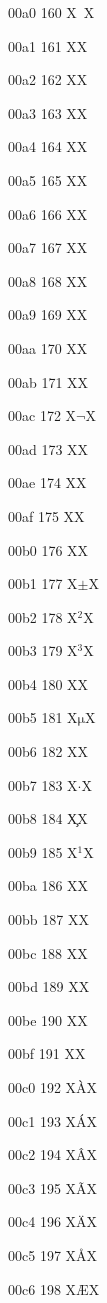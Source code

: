 \documentclass[11pt]{article}
\begin{document}
00a0 160 X{~}X

00a1 161 X{\textexclamdown}X

00a2 162 X{\textcent}X

00a3 163 X{\textsterling}X

00a4 164 X{\textcurrency}X

00a5 165 X{\textyen}X

00a6 166 X{\textbrokenbar}X

00a7 167 X{\textsection}X

00a8 168 X{\textasciidieresis}X

00a9 169 X{\textcopyright}X

00aa 170 X{\textordfeminine}X

00ab 171 X{\guillemotleft}X

00ac 172 X{\ensuremath{\lnot}}X

00ad 173 X{\-}X

00ae 174 X{\textregistered}X

00af 175 X{\textasciimacron}X

00b0 176 X{\textdegree}X

00b1 177 X{\ensuremath{\pm}}X

00b2 178 X{\ensuremath{^2}}X

00b3 179 X{\ensuremath{^3}}X

00b4 180 X{\textasciiacute}X

00b5 181 X{\ensuremath{\mathrm{\mu}}}X

00b6 182 X{\textparagraph}X

00b7 183 X{\ensuremath{\cdot}}X

00b8 184 X{\c{}}X

00b9 185 X{\ensuremath{^1}}X

00ba 186 X{\textordmasculine}X

00bb 187 X{\guillemotright}X

00bc 188 X{\textonequarter}X

00bd 189 X{\textonehalf}X

00be 190 X{\textthreequarters}X

00bf 191 X{\textquestiondown}X

00c0 192 X{\`A}X

00c1 193 X{\'A}X

00c2 194 X{\^A}X

00c3 195 X{\~A}X

00c4 196 X{\"A}X

00c5 197 X{\AA}X

00c6 198 X{\AE}X
\end{document}
